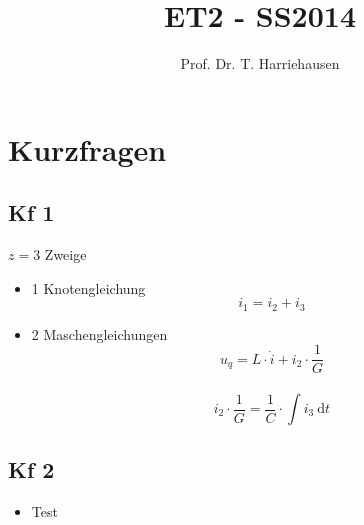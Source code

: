\documentclass[10pt,a4paper]{article}
\title{ET2 - SS2014}
\author{Prof. Dr. T. Harriehausen}
\begin{document}
\section*{Kurzfragen}
\subsection*{Kf 1}
$z=3$ Zweige
\renewcommand{\labelitemi}{$\rightarrow$}
\begin{itemize}
\item 	1 Knotengleichung \\
			\[i_1=i_2+i_3\]
\item 	2 Maschengleichungen \\
			\[u_q=L \cdot \dot{i}+i_2 \cdot \frac{1}{G}\] \\
			\[i_2 \cdot \frac{1}{G}=\frac{1}{C} \cdot \int \! i_3 ~\mathrm{d}t\]
\end{itemize}
\subsection*{Kf 2}
\begin{itemize}
\item Test
\end{itemize}
\end{document}
